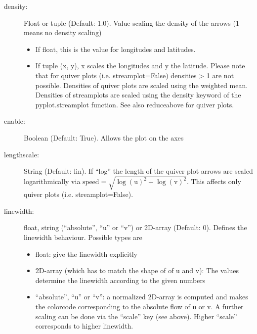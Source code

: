 \begin{description}
    \item[\gls*{density}:] \label{item:density}  Float or tuple (Default: 1.0). Value scaling the density of the arrows (1 means no density scaling)
\begin{itemize}
    \item If float, this is the value for longitudes and latitudes.
    \item If tuple (x, y), x scales the longitudes and y the latitude. Please note that for quiver plots (i.e. streamplot=False) densities > 1 are not possible. Densities of quiver plots are scaled using the weighted mean. Densities of streamplots are scaled using the density keyword of the pyplot.streamplot function. See also reduceabove for quiver plots.
\end{itemize}

    \item[\gls*{enable}:] \label{item:enable}  Boolean (Default: True). Allows the plot on the axes
    \item[\gls*{lengthscale}:] \label{item:lengthscale}  String (Default: lin). If \enquote{log} the length of the quiver plot arrows are scaled logarithmically via $\mathrm{speed}=\sqrt{\log(\mathrm{u})^2+\log(\mathrm{v})^2}$. This affects only quiver plots (i.e. streamplot=False).
    \item[\gls*{linewidth}:] \label{item:linewidth}  float, string (\enquote{absolute}, \enquote{u} or \enquote{v}) or 2D-array (Default: 0). Defines the linewidth behaviour. Possible types are
\begin{itemize}
    \item float: give the linewidth explicitly
    \item 2D-array (which has to match the shape of of u and v): The values determine the linewidth according to the given numbers
    \item \enquote{absolute}, \enquote{u} or \enquote{v}: a normalized 2D-array is computed and makes the colorcode corresponding to the absolute flow of u or v. A further scaling can be done via the \enquote{scale} key (see above). Higher \enquote{scale} corresponds to higher linewidth.
\end{itemize}


\end{description}
